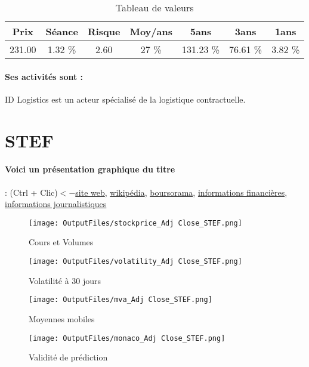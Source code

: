 \documentclass[11pt,a4paper]{report}%
\begin{document}
\begin{table}[H]
  \centering
    \begin{tabular}{|c|c|c|c|c|c|c|}
    \hline
    Prix & Séance & Risque  & Moy/ans & 5ans & 3ans & 1ans \\
    \hline
    231.00 &    1.32 \%    & 2.60 & 27 \% & 131.23 \% & 76.61 \% & 3.82 \% \\
    \hline
    \end{tabular}%
        \label{tab:table_ID 27ISTICS}%
      \caption{Tableau de valeurs}
\end{table}%

\paragraph{Ses activités sont : } ID Logistics est un acteur spécialisé de la logistique contractuelle. 
    
    \newpage

\section{STEF}

\paragraph{Voici un présentation graphique du titre} : (Ctrl + Clic)$<-$\href{https://www.stef.com/investisseurs}{site web}, \href{https://fr.wikipedia.org/wiki/Stef_(entreprise)}{wikipédia}, \href{https://www.boursorama.com/cours/1rPSTF}{boursorama}, \href{https://www.qwant.com/?q=site:https:%2f%2fwww.easybourse.com%2faction-societe%2fSTEF&t=web&client=ext-firefox-hp}{informations financières}, \href{https://bourse.lerevenu.com/cours-de-bourse/fiche-valeur-synthese/STEF/STF-FR}{informations journalistiques}
\begin{figure}[!htb]
   \begin{minipage}{0.5\textwidth}
     \centering
     \texttt{[image: OutputFiles/stockprice\_Adj Close\_STEF.png]}
     \caption{Cours et Volumes}\label{Fig:price_STEF}
   \end{minipage}\hfill
   \begin{minipage}{0.5\textwidth}
     \centering
     \texttt{[image: OutputFiles/volatility\_Adj Close\_STEF.png]}
     \caption{Volatilité à 30 jours}\label{Fig:volat_STEF}
   \end{minipage}
\end{figure}
\begin{figure}[!htb]
   \begin{minipage}{0.5\textwidth}
     \centering
     \texttt{[image: OutputFiles/mva\_Adj Close\_STEF.png]}
     \caption{Moyennes mobiles}\label{Fig:mva_STEF}
   \end{minipage}\hfill
   \begin{minipage}{0.5\textwidth}
     \centering
     \texttt{[image: OutputFiles/monaco\_Adj Close\_STEF.png]}
     \caption{Validité de prédiction}\label{Fig:prediction_STEF}
   \end{minipage}
\end{figure}
\end{document}
